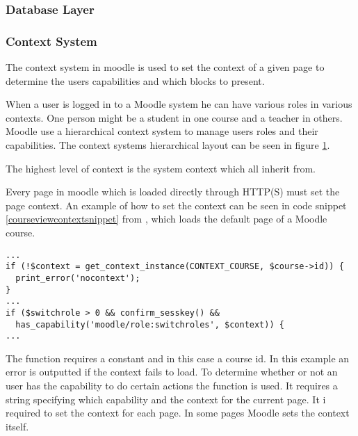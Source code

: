 	
	
	
	
	\subsubsection{Database Layer}
	
	
	
	
	
	\subsubsection{Context System}
The context system in moodle is used to set the context of a given page to determine the users capabilities and which blocks to present.
 
When a user is logged in to a Moodle system he can have various roles in various contexts. 
One person might be a student in one course and a teacher in others. 
Moodle use a hierarchical context system to manage users roles and their capabilities. 
The context systems hierarchical layout can be seen in figure \ref{fig:moodle-contexts}.
 
 \begin{figure}
	 \centering
	 \label{fig:moodle-contexts}
 \end{figure}

The highest level of context is the system context which all inherit from. 

Every page in moodle which is loaded directly through HTTP(S) must set the page context. 
An example of how to set the context can be seen in code snippet \ref{courseviewcontextsnippet} from , which loads the default page of a Moodle course.

\begin{lstlisting}[style=phpCode, caption=\myCaption{A snippet from \moodlefile{/course/view.php}}, label=courseviewcontextsnippet]
...
if (!$context = get_context_instance(CONTEXT_COURSE, $course->id)) {
  print_error('nocontext');
}
...
if ($switchrole > 0 && confirm_sesskey() &&
  has_capability('moodle/role:switchroles', $context)) {
...	
\end{lstlisting}
The function  requires a constant and in this case a course id. 
In this example an error is outputted if the context fails to load. 
To determine whether or not an user has the capability to do certain actions the function  is used. It requires a string specifying which capability and the context for the current page. 
It i required to set the context for each page. 
In some pages Moodle sets the context itself. 

